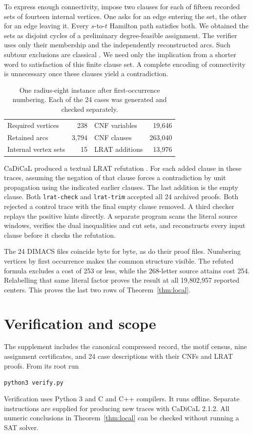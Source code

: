\documentclass[11pt]{article}
\newcommand{\code}[1]{\texttt{#1}}
\begin{document}
To express enough connectivity, impose two clauses for each of fifteen recorded sets of fourteen internal vertices. One asks for an edge entering the set, the other for an edge leaving it. Every \(s\)-to-\(t\) Hamilton path satisfies both. We obtained the sets as disjoint cycles of a preliminary degree-feasible assignment. The verifier uses only their membership and the independently reconstructed arcs. Such subtour exclusions are classical \cite{dfj}. We need only the implication from a shorter word to satisfaction of this finite clause set. A complete encoding of connectivity is unnecessary once these clauses yield a contradiction.

\begin{table}[h]\centering
\caption{One radius-eight instance after first-occurrence numbering. Each of the 24 cases was generated and checked separately.}
\smallskip\small
\begin{tabular}{@{}lr@{\qquad}lr@{}}\toprule
Required vertices & 238 & CNF variables & 19,646\\
Retained arcs & 3,794 & CNF clauses & 263,040\\
Internal vertex sets & 15 & LRAT additions & 13,976\\\bottomrule
\end{tabular}
\end{table}

CaDiCaL produced a textual LRAT refutation \cite{lrat,cadical}. For each added clause in these traces, assuming the negation of that clause forces a contradiction by unit propagation using the indicated earlier clauses. The last addition is the empty clause. Both \code{lrat-check} and \code{lrat-trim} accepted all 24 archived proofs. Both rejected a control trace with the final empty clause removed. A third checker replays the positive hints directly. A separate program scans the literal source windows, verifies the dual inequalities and cut sets, and reconstructs every input clause before it checks the refutation.

The 24 DIMACS files coincide byte for byte, as do their proof files. Numbering vertices by first occurrence makes the common structure visible. The refuted formula excludes a cost of 253 or less, while the 268-letter source attains cost 254. Relabelling that same literal factor proves the result at all 19,802,957 reported centers. This proves the last two rows of Theorem~\ref{thm:local}.

\clearpage
\section{Verification and scope}\label{sec:check}
The supplement includes the canonical compressed record, the motif census, nine assignment certificates, and 24 case descriptions with their CNFs and LRAT proofs. From its root run
\begin{center}\code{python3 verify.py}\end{center}
Verification uses Python 3 and C and C++ compilers. It runs offline. Separate instructions are supplied for producing new traces with CaDiCaL 2.1.2. All numeric conclusions in Theorem~\ref{thm:local} can be checked without running a SAT solver.
\end{document}
